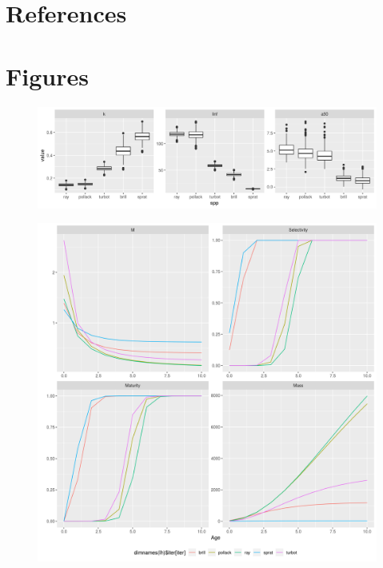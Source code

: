 \documentclass[preprint,12pt]{elsarticle}
\begin{document}
\section{References}


 

\section{Figures}

\begin{figure}[]\centering\includegraphics[width=5in]{rg-lhpar-1.png}\caption{}\label{fig:lh}\end{figure}
\begin{figure}[]\centering\includegraphics[width=5in]{rg-vectors-1.png}\caption{}\label{fig:vector}\end{figure}
\end{document}
